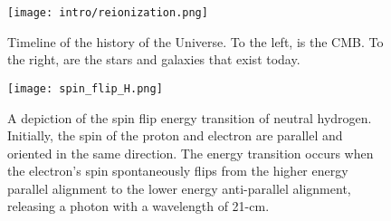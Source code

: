

\begin{figure}[th]
	\centering
	\texttt{[image: intro/reionization.png]}
	\caption[Epoch of Reionization Timeline]{Timeline of the history of the Universe. To the left, is the CMB. To the right, are the stars and galaxies that exist today.}
	\label{fig:timeline}
\end{figure}

\begin{figure}[th]
	\centering
	\texttt{[image: spin\_flip\_H.png]}
	\caption[Spin-Flip Transition]{A depiction of the spin flip energy transition of neutral hydrogen. Initially,
																					 the spin of the proton and electron are parallel and oriented
																					 in the same direction. The energy transition occurs when the electron's spin spontaneously
																					 flips from the higher energy parallel alignment to the lower energy anti-parallel alignment,
																					 releasing a photon with a wavelength of 21-cm.}
	\label{fig:spin_flip}
\end{figure}
